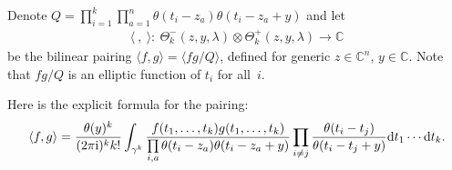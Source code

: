 \documentclass[10pt,a4paper]{amsart}
\numberwithin{equation}{section}
\begin{document}
\begin{Definition} Denote $Q=\prod\limits_{i=1}^k\prod\limits_{a=1}^n\theta(t_i-z_a)\theta(t_i-z_a+y)$ and let
 \begin{gather*}
 \langle \ , \ \rangle\colon \ \Theta^-_k(z,y,\lambda)\otimes\Theta^+_k(z,y,\lambda)\to
 \mathbb C
 \end{gather*}
 be the bilinear pairing $ \langle f,g\rangle= \langle fg/Q\rangle $, defined for generic $z\in\mathbb C^n$, $y\in\mathbb C$. Note that $fg/Q$ is an elliptic function of $t_i$ for all~$i$.
\end{Definition}
Here is the explicit formula for the pairing:
\begin{gather}\label{e-pairing}
\langle f,g\rangle=\frac{\theta(y)^k}{(2\pi{\rm i})^kk!}\int_{\gamma^k}\frac{f(t_1,\dots,t_k)g(t_1,\dots,t_k)}{\prod\limits_{i,a}\theta(t_i-z_a)\theta(t_i-z_a+y)}\prod_{i\neq j}\frac{\theta(t_i-t_j)}{\theta(t_i-t_j+y)}
{\rm d}t_1\cdots {\rm d}t_k.
\end{gather}
\end{document}
